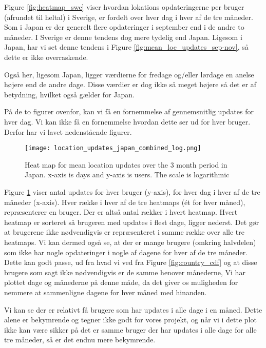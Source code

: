 Figure \ref{fig:heatmap_swe} viser hvordan lokations opdateringerne per bruger (afrundet til heltal) i Sverige, er fordelt over hver dag i hver af de tre måneder. Som i Japan er der generelt flere opdateringer i september end i de andre to måneder. I Sverige er denne tendens dog mere tydelig end Japan. Ligesom i Japan, har vi set denne tendens i Figure 
\ref{fig:mean_loc_updates_sep-nov}, så dette er ikke overraskende. 
 
Også her, ligesom Japan, ligger værdierne for fredage og/eller lørdage en anelse højere end de andre dage. Disse værdier er dog ikke så meget højere så det er af betydning, hvilket også gælder for Japan. 

På de to figurer ovenfor, kan vi få en fornemmelse af gennemsnitlig updates for hver dag. Vi kan ikke få en fornemmelse hvordan dette ser ud for hver bruger. Derfor har vi lavet nedenstående figurer. 

\begin{figure}[H]
    \hspace*{-1.5cm}
    \centering
    \texttt{[image: location\_updates\_japan\_combined\_log.png]}
    \caption{Heat map for mean location updates over the 3 month period in Japan. x-axis is days and y-axis is users. The scale is logarithmic}
    \vspace{-12pt}
    \label{fig:heatmap_japan_combined}
\end{figure}
Figure \ref{fig:heatmap_japan_combined} viser antal updates for hver bruger (y-axis), for hver dag i hver af de tre måneder (x-axis). Hver række i hver af de tre heatmaps (ét for hver måned), repræsenterer en bruger. Der er altså \numberUsersJapan{} antal rækker i hvert heatmap. Hvert heatmap er sorteret så brugeren med updates i flest dage, ligger nederst. Det gør at brugerene ikke nødvendigvis er repræsenteret i samme række over alle tre heatmaps. Vi kan dermed også se, at der er mange brugere (omkring halvdelen) som ikke har nogle opdateringer i nogle af dagene for hver af de tre måneder. Dette kan godt passe, ud fra hvad vi ved fra Figure \ref{fig:country_cdf} og at disse brugere som sagt ikke nødvendigvis er de samme henover månederne, 
Vi har plottet dage og månederne på denne måde, da det giver os muligheden for nemmere at sammenligne dagene for hver måned med hinanden. 

Vi kan se der er relativt få brugere som har updates i alle dage i en måned. Dette alene er bekymrende og tegner ikke godt for vores projekt, og når vi i dette plot ikke kan være sikker på det er samme bruger der har updates i alle dage for alle tre måneder, så er det endnu mere bekymrende. 

